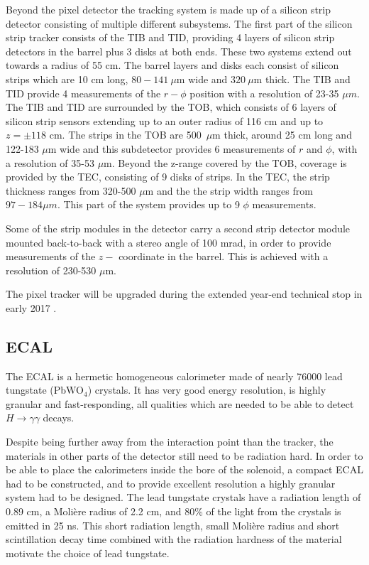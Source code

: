 Beyond the pixel detector the tracking system is made up of a silicon
strip detector consisting of multiple different subsystems. The first part of the
silicon strip tracker consists of the \ac{TIB} and \ac{TID}, providing 4 layers of
silicon strip detectors in the barrel plus 3 disks at both ends. These two systems
extend out towards a radius of 55 cm. The barrel layers and disks each consist
of silicon strips which are 10 cm long, $80-141~\mu$m wide and $320~\mu$m thick. The \ac{TIB} and \ac{TID}
provide 4 measurements of the $r-\phi$ position  with a resolution of 23-35 $\mu m$.
The \ac{TIB} and \ac{TID} are surrounded by the \ac{TOB}, which consists of 6 layers of silicon strip sensors extending
up to an outer radius of 116 cm and up to $z=\pm 118$ cm. The strips in the \ac{TOB} are 500~$\mu$m thick, around 25 cm long and 122-183 $\mu$m 
wide and this subdetector provides 6 measurements of $r$ and $\phi$, with a resolution
of 35-53 $\mu$m. Beyond the z-range covered by the \ac{TOB}, coverage is provided by the \ac{TEC},
consisting of 9 disks of strips. In the \ac{TEC}, the strip thickness ranges from 320-500 $\mu$m and the the strip width ranges from $97-184 \mu m$.
This part of the system provides up to 9 $\phi$ measurements.

Some of the strip modules in the detector carry a second strip detector module mounted back-to-back with a stereo angle %
of 100 mrad, in order to provide measurements of the $z-$ coordinate in the barrel. This is achieved with a resolution of 230-530 $\mu$m.

The pixel tracker will be upgraded during the extended year-end technical stop in early 2017 \cite{cms-pixel-upgrade}. %


\subsection{\acl{ECAL}}
\label{sec:CMSLHC_CMS_ecal}
The \ac{ECAL} \cite{cms-jinst} is a hermetic homogeneous calorimeter
made of nearly 76000 lead tungstate (PbWO$_4$) crystals. It has very
good energy resolution, is highly granular and fast-responding, all qualities 
which are needed to be able to detect $H\rightarrow \gamma\gamma$ decays.

Despite being further away from the interaction
point than the tracker, the materials in other parts of the detector
still need to be radiation hard. In order to be able to place
the calorimeters inside the bore of the solenoid, a compact \ac{ECAL}
had to be constructed, and to provide excellent resolution a 
highly granular system had to be designed. The lead tungstate crystals have a 
radiation length of 0.89 cm, a Moli\`ere radius of 2.2 cm, and 80\% of the light
from the crystals is emitted in 25 ns. This short radiation
length, small Moli\`ere radius and short scintillation decay time combined
with the radiation hardness of the material motivate the choice of lead tungstate. 

